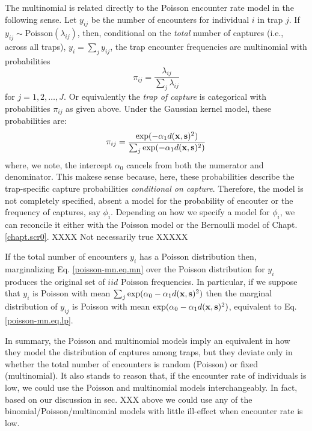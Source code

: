 The multinomial is related directly to the Poisson encounter rate
model in the following sense. Let $y_{ij}$ be the number of
encounters for individual $i$ in trap $j$. If $y_{ij} \sim
\mbox{Poisson}(\lambda_{ij})$,
then,
conditional on the {\it total}
number of captures (i.e., across all traps), $y_{i} = \sum_{j}
y_{ij}$, the trap encounter frequencies are multinomial with
probabilities
\[
 \pi_{ij} =  \frac{ \lambda_{ij} } { \sum_{j} \lambda_{ij} }
\]
for $j=1,2,\ldots,J$.
Or equivalently the {\it trap of
  capture} is categorical with probabilities $\pi_{ij}$ as given above.
Under the Gaussian kernel model, these probabilities are:
\begin{equation}
\pi_{ij} =  \frac{ \exp( - \alpha_{1}  d({\bf x},{\bf s})^2 ) }  {
   \sum_{j} \exp(-\alpha_{1} d({\bf x},{\bf s})^2)}
\label{poisson-mn.eq.mnprobs}
\end{equation}
where, we note, the intercept $\alpha_{0}$ cancels from both the
numerator and denominator. This makese sense because, here, these
probabilities describe the trap-specific capture probabilities {\it
  conditional on capture}. 
Therefore, the model is not completely specified, absent a model for the
probability of encouter or the frequency of captures, say
$\phi_{i}$. Depending on how we specify a model for $\phi_{i}$, we can
reconcile it either with the Poisson model or the Bernoulli model of
Chapt. \ref{chapt.scr0}.  XXXX Not necessarily true XXXXX

If the total number of encounters $y_{i}$ has a Poisson distribution
then, marginalizing Eq. \ref{poisson-mn.eq.mn} over the Poisson
distribution for $y_{i}$ produces the original set of $iid$ Poisson
frequencies.  In particular, if we suppose that $y_{i}$ is Poisson
with mean 
$\sum_{j} \exp(\alpha_{0} -\alpha_{1} d({\bf x},{\bf s})^2)$
then the marginal distribution of $y_{ij}$ is Poisson with mean $\exp(
\alpha_{0} - \alpha_{1} d({\bf x},{\bf s})^2 )$, equivalent to
Eq. \ref{poisson-mn.eq.lp}.

In summary, the Poisson and multinomial models imply an equivalent in how
they model the distribution of captures among traps, but they deviate
only in whether the total number of encounters is random (Poisson) or
fixed (multinomial).  It also stands to reason that, if the encounter
rate of individuals is low, we could use the Poisson and multinomial
models interchangeably. In fact, based on our discussion in sec. XXX
above we could use any of the binomial/Poisson/multinomial models with
little ill-effect when encounter rate is low. 

